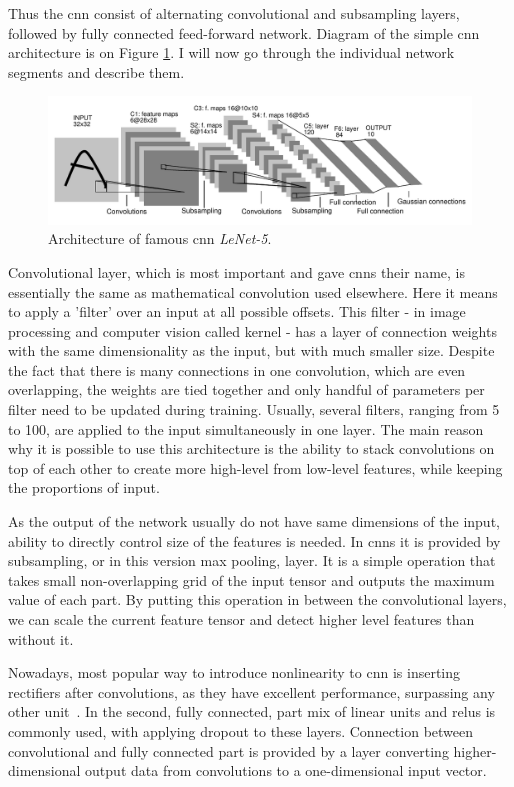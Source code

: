 Thus the \gls{cnn} consist of alternating convolutional and subsampling layers, followed by fully connected feed-forward network. Diagram of the simple \gls{cnn} architecture is on Figure \ref{fig:lenet}. I will now go through the individual network segments and describe them.

\begin{figure}[!t]
	\centering
	\includegraphics[width=\textwidth]{./fig/lenet.pdf}
	\caption{Architecture of famous \gls{cnn} \emph{LeNet-5}.~\cite{lecun-98}
		\label{fig:lenet}}
\end{figure}

Convolutional layer, which is most important and gave \gls{cnn}s their name, is essentially the same as mathematical convolution used elsewhere. Here it means to apply a 'filter' over an input at all possible offsets. This filter - in image processing and computer vision called kernel - has a layer of connection weights with the same dimensionality as the input, but with much smaller size. Despite the fact that there is many connections in one convolution, which are even overlapping, the weights are tied together and only handful of parameters per filter need to be updated during training. Usually, several filters, ranging from 5 to 100, are applied to the input simultaneously in one layer. The main reason why it is possible to use this architecture is the ability to stack convolutions on top of each other to create more high-level from low-level features, while keeping the proportions of input.

As the output of the network usually do not have same dimensions of the input, ability to directly control size of the features is needed. In \gls{cnn}s it is provided by subsampling, or in this version max pooling, layer. It is a simple operation that takes small non-overlapping grid of the input tensor and outputs the maximum value of each part. By putting this operation in between the convolutional layers, we can scale the current feature tensor and detect higher level features than without it.

Nowadays, most popular way to introduce nonlinearity to \gls{cnn} is inserting rectifiers after convolutions, as they have excellent performance, surpassing any other unit~\cite{jarrett-iccv-09, DBLP:conf/icml/NairH10}. In the second, fully connected, part mix of linear units and \gls{relu}s is commonly used, with applying dropout to these layers. Connection between convolutional and fully connected part is provided by a layer converting higher-dimensional output data from convolutions to a one-dimensional input vector.

